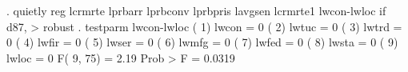 . quietly reg lcrmrte lprbarr lprbconv lprbpris lavgsen lcrmrte1 lwcon-lwloc if d87, 
> robust
{\smallskip}
. testparm lwcon-lwloc
{\smallskip}
 ( 1)  lwcon = 0
 ( 2)  lwtuc = 0
 ( 3)  lwtrd = 0
 ( 4)  lwfir = 0
 ( 5)  lwser = 0
 ( 6)  lwmfg = 0
 ( 7)  lwfed = 0
 ( 8)  lwsta = 0
 ( 9)  lwloc = 0
{\smallskip}
       F(  9,    75) =    2.19
            Prob > F =    0.0319
{\smallskip}

